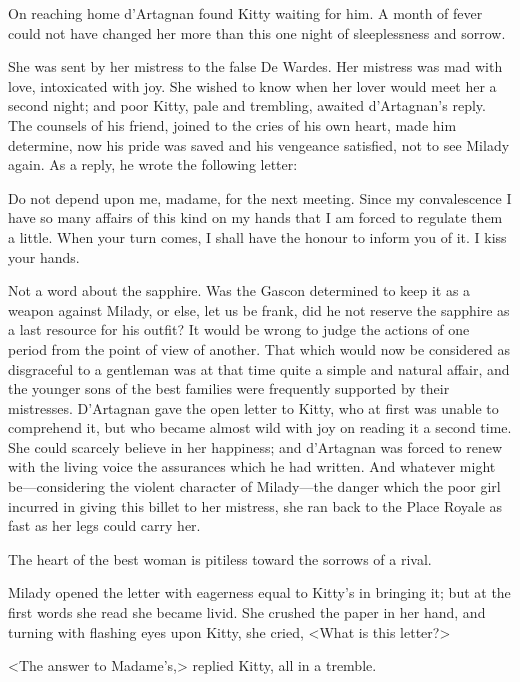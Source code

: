 On reaching home d'Artagnan found Kitty waiting for him. A month of fever could not have changed her more than this one night of sleeplessness and sorrow. 

She was sent by her mistress to the false De Wardes. Her mistress was mad with love, intoxicated with joy. She wished to know when her lover would meet her a second night; and poor Kitty, pale and trembling, awaited d'Artagnan's reply. The counsels of his friend, joined to the cries of his own heart, made him determine, now his pride was saved and his vengeance satisfied, not to see Milady again. As a reply, he wrote the following letter: 

\begin{mail}{}{}
Do not depend upon me, madame, for the next meeting. Since my convalescence I have so many affairs of this kind on my hands that I am forced to regulate them a little. When your turn comes, I shall have the honour to inform you of it. I kiss your hands. 
\end{mail}

Not a word about the sapphire. Was the Gascon determined to keep it as a weapon against Milady, or else, let us be frank, did he not reserve the sapphire as a last resource for his outfit? It would be wrong to judge the actions of one period from the point of view of another. That which would now be considered as disgraceful to a gentleman was at that time quite a simple and natural affair, and the younger sons of the best families were frequently supported by their mistresses. D'Artagnan gave the open letter to Kitty, who at first was unable to comprehend it, but who became almost wild with joy on reading it a second time. She could scarcely believe in her happiness; and d'Artagnan was forced to renew with the living voice the assurances which he had written. And whatever might be---considering the violent character of Milady---the danger which the poor girl incurred in giving this billet to her mistress, she ran back to the Place Royale as fast as her legs could carry her. 

The heart of the best woman is pitiless toward the sorrows of a rival. 

Milady opened the letter with eagerness equal to Kitty's in bringing it; but at the first words she read she became livid. She crushed the paper in her hand, and turning with flashing eyes upon Kitty, she cried, <What is this letter?> 

<The answer to Madame's,> replied Kitty, all in a tremble. 

